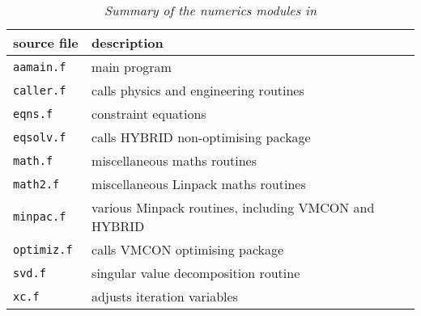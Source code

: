 
\begin{table}
\begin{center}

\begin{tabular}{||l||l||} \hline
source file   & description \\ \hline
\tt aamain.f  & \rm main program \\
\tt caller.f  & \rm calls physics and engineering routines \\
\tt eqns.f    & \rm constraint equations \\
\tt eqsolv.f  & \rm calls HYBRID non-optimising package \\
\tt math.f    & \rm miscellaneous maths routines \\
\tt math2.f   & \rm miscellaneous Linpack maths routines \\
\tt minpac.f  & \rm various Minpack routines, including VMCON and HYBRID \\
\tt optimiz.f & \rm calls VMCON optimising package \\
\tt svd.f     & \rm singular value decomposition routine \\
\tt xc.f      & \rm adjusts iteration variables \\ \hline
\end{tabular}
\end{center}
\caption[TABLE_NUM]{{\it
Summary of the numerics modules in \PSD
}}
\label{tab:numerics}
\end{table}
